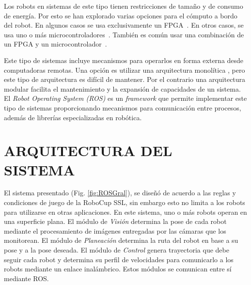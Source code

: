 \documentclass[twocolumn,10pt]{amrob}
\newcommand{\EXCISE}[1]{}
\begin{document}
Los robots en sistemas de este tipo tienen restricciones de tamaño y de consumo de energía. Por esto se han explorado varias opciones para el cómputo a bordo del robot. En algunos casos se usa exclusivamente un FPGA~\cite{chaisoskuba}. En otros casos, se usa uno o más microcontroladores~\cite{rylltigers,egorova2003fu}. También es común usar una combinación de un FPGA y un microcontrolador~\cite{parsian-tdp-2011}.

Este tipo de sistemas incluye mecanismos para operarlos en forma externa desde computadoras remotas. Una opción es utilizar una arquitectura monolítica \cite{mosleh}, pero este tipo de arquitectura  es difícil de mantener. Por el contrario una arquitectura modular facilita el mantenimiento y la expansión de capacidades de un sistema. El \textit{Robot Operating System (ROS)} \cite{quigley2009ros} es un \textit{framework} que permite implementar este tipo de sistemas proporcionando mecanismos para comunicación entre procesos, adem\'as de   librerías especializadas en robótica.
 
\EXCISE{
  El robot presentado en este trabajo se probó inicialmente en el contexto de Robocup \emph{Small Size League} (SSL) \cite{sslWiki}. Los robots deben caber en un cilindro de 18 cm de altura por 15 cm de diámetro y deben moverse sin dañar la carpeta que forma la cancha. La pose de los robots se obtiene con un sistema de visión integrado por cámaras en la parte superior de la cancha además del software provisto por la liga para el procesamiento de imágenes. Esto requiere que los robots tengan un \textit{Patrón Estandar} de colores en su parte superior. En esta competencia, la mayoría de los equipos utiliza un control de velocidad, sin embargo, en 2011, SKUBA presentó un control basado en el torque del motor \cite{chaisoskuba}. 
}

\section*{ARQUITECTURA DEL SISTEMA}
\label{sec:arquitectura_sistema}

El sistema presentado (Fig. \ref{fig:ROSGral}), se diseñó de acuerdo a las reglas y condiciones de juego de la RoboCup SSL, sin embargo esto no limita a los robots para utilizarse en otras aplicaciones. En este sistema, uno o más robots operan en una superficie plana. El módulo de \emph{Visión} determina la pose de cada robot mediante el procesamiento de imágenes entregadas por las cámaras que los monitorean. El módulo de \emph{Planeación} determina la ruta del robot en base a su pose y a la pose deseada. El módulo de \emph{Control} genera trayectoria que debe seguir cada robot y determina su perfil de velocidades para comunicarlo a los robots mediante un enlace inalámbrico. Estos módulos se comunican entre sí mediante ROS. 
\end{document}
